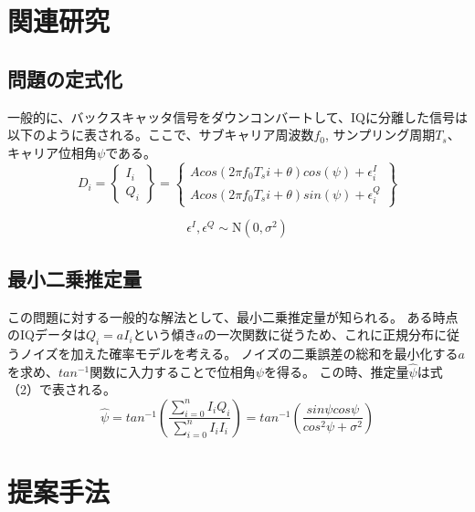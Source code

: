 \documentclass[a4j,10pt]{jsarticle}
\begin{document}
\section{関連研究}
\subsection{問題の定式化}
一般的に、バックスキャッタ信号をダウンコンバートして、IQに分離した信号は以下のように表される。ここで、サブキャリア周波数$f_{0}$, サンプリング周期$T_{s}$、キャリア位相角$\psi$である。
\begin{equation}
    D_{i} = 
    \begin{Bmatrix}
        I_{i} \\ Q_{i}
    \end{Bmatrix}
    =
    \begin{Bmatrix}
        A cos(2 \pi f_{0} T_{s}i + \theta) cos(\psi) + \epsilon^{I}_{i} \\ Acos(2 \pi f_{0} T_{s}i + \theta)sin(\psi) + \epsilon^{Q}_{i}
    \end{Bmatrix}
\end{equation}

\begin{equation}
    \epsilon^I, \epsilon^Q \sim \mathrm{N}(0, \sigma^2) \nonumber
\end{equation}

\subsection{最小二乗推定量}
この問題に対する一般的な解法として、最小二乗推定量が知られる。
ある時点のIQデータは$Q_{i} = a I_{i}$という傾き$a$の一次関数に従うため、これに正規分布に従うノイズを加えた確率モデルを考える。
ノイズの二乗誤差の総和を最小化する$a$を求め、$tan^{-1}$関数に入力することで位相角$\psi$を得る。
この時、推定量$\hat{\psi}$は式（2）で表される。
\begin{equation}
    \hat{\psi} = tan^{-1}(\frac{\sum_{i=0}^n I_{i}Q_{i}}{\sum_{i=0}^n I_{i}I_{i}}) = tan^{-1}(\frac{sin\psi cos\psi}{cos^2\psi + \sigma^2})
\end{equation}

\section{提案手法}
\end{document}
